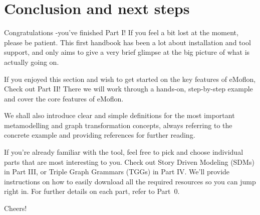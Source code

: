 \newpage \genHeader

\vspace*{2cm}

\section{Conclusion and next steps}
\vspace{0.5cm}

\hypertarget{conclusion}{} 
Congratulations -you've finished Part I! If you feel a bit lost at the moment, please be patient. This first handbook has been a lot
about installation and tool support, and only aims to give a very brief glimpse at the big picture of what is actually going on.

If you enjoyed this section and wish to get started on the key features of eMoflon, Check out Part II! There we will work through a hands-on, step-by-step
example and cover the core features of eMoflon.

We shall also introduce clear and simple definitions for the most important metamodelling and graph transformation concepts, always referring to the concrete
example and providing references for further reading.

If you're already familiar with the tool, feel free to pick and choose individual parts that are most interesting to you. Check out Story Driven Modeling (SDMs)
in Part III, or Triple Graph Grammars (TGGs) in Part IV. We'll provide instructions on how to easily download all the required resources so you can jump
right in. For further details on each part, refer to Part~0.

Cheers!